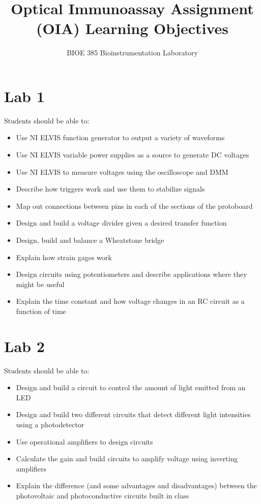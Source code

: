 \documentclass{article}
\title{Optical Immunoassay Assignment (OIA) Learning Objectives}
\author{BIOE 385 Bioinstrumentation Laboratory}
\date{}
\begin{document}
\large
\maketitle
\section*{Lab 1}
Students should be able to:
\begin{itemize}
	\item Use NI ELVIS function generator to output a variety of waveforms   
	\item Use NI ELVIS variable power supplies as a source to generate DC voltages   
	\item Use NI ELVIS to measure voltages using the oscilloscope and DMM   
	\item Describe how triggers work and use them to stabilize signals   
	\item Map out connections between pins in each of the sections of the protoboard   
	\item Design and build a voltage divider given a desired transfer function   
	\item Design, build and balance a Wheatstone bridge   
	\item Explain how strain gages work   
	\item Design circuits using potentiometers and describe applications where they might be useful   
	\item Explain the time constant and how voltage changes in an RC circuit as a function of time   
\end{itemize}

\section*{Lab 2}
Students should be able to:
\begin{itemize}
	\item Design and build a circuit to control the amount of light emitted from an LED   
	\item Design and build two different circuits that detect different light intensities using a photodetector   
	\item Use operational amplifiers to design circuits   
	\item Calculate the gain and build circuits to amplify voltage using inverting amplifiers   
	\item Explain the difference (and some advantages and disadvantages) between the photovoltaic and photoconductive circuits built in class   
\end{itemize}
\end{document}
